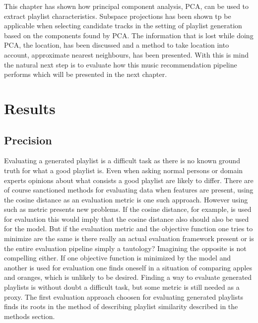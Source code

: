 \documentclass[a4paper,11pt]{kth-mag}
\begin{document}
This chapter has shown how principal component analysis, PCA, can be used to extract playlist characteristics. Subspace projections has been shown tp be applicable when selecting candidate tracks in the setting of playlist generation based on the components found by PCA. The information that is lost while doing PCA, the location, has been discussed and a method to take location into account, approximate nearest neighbours, has been presented. With this is mind the natural next step is to evaluate how this music recommendation pipeline performs which will be presented in the next chapter.

\chapter{Results}
\section{Precision}
Evaluating a generated playlist is a difficult task as there is no known ground truth for what a good playlist is. Even when asking normal persons or domain experts opinions about what consists a good playlist are likely to differ. There are of course sanctioned methods for evaluating data when features are present, using the cosine distance as an evaluation metric is one such approach. However using such as metric presents new problems. If the cosine distance, for example, is used for evaluation this would imply that the cosine distance also should also be used for the model. But if the evaluation metric and the objective function one tries to minimize are the same is there really an actual evaluation framework present or is the entire evaluation pipeline simply a tautology? Imagining the opposite is not compelling either. If one objective function is minimized by the model and another is used for evaluation one finds oneself in a situation of comparing apples and oranges, which is unlikely to be desired. Finding a way to evaluate generated playlists is without doubt a difficult task, but some metric is still needed as a proxy.
The first evaluation approach choosen for evaluating generated playlists finds its roots in the method of describing playlist similarity described in the methods section. 
\end{document}
